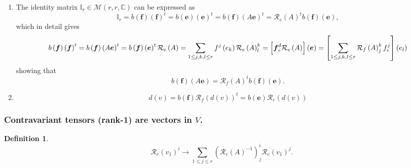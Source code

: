 \documentclass[aps,preprint]{revtex4}
\newtheorem{definition}[theorem]{Definition}
\begin{document}
\begin{enumerate}
\begin{enumerate}
\item The identity matrix $\mathbb{I}_{r}\in \mathcal{M}\left( r,r,\mathbb{C}%
\right) $ can be expressed as 
\begin{equation}
\mathbb{I}_{r}=b\left( \boldsymbol{f}\right) \left( \boldsymbol{f}\right)
^{t}=b\left( \boldsymbol{e}\right) \left( \boldsymbol{e}\right) ^{t}=b\left( 
\boldsymbol{f}\right) \left( A\boldsymbol{e}\right) ^{t}=\mathcal{R}%
_{e}\left( A\right) ^{t}b\left( \boldsymbol{f}\right) \left( \boldsymbol{e}%
\right) ,
\end{equation}%
which in detail gives%
\begin{equation}
b\left( \boldsymbol{f}\right) \left( \boldsymbol{f}\right) ^{t}=b\left( 
\boldsymbol{f}\right) \left( A\boldsymbol{e}\right) ^{t}=b\left( \boldsymbol{%
f}\right) \left( \boldsymbol{e}\right) ^{t}\mathcal{R}_{e}\left( A\right)
=\sum_{1\leq j,k,l\leq r}f^{j}\left( e_{k}\right) \mathcal{R}_{e}\left(
A\right) _{l}^{k}=\left[ \boldsymbol{f}_{e}^{d}\mathcal{R}_{e}\left(
A\right) \right] \left( \boldsymbol{e}\right) =\left[ \sum_{1\leq j,k,l\leq
r}\mathcal{R}_{f}\left( A\right) _{j}^{k}f_{e}^{j}\right] \left( e_{l}\right)
\end{equation}%
showing that%
\begin{equation}
b\left( \boldsymbol{f}\right) \left( A\boldsymbol{e}\right) =\mathcal{R}%
_{f}\left( A\right) ^{t}b\left( \boldsymbol{f}\right) \left( \boldsymbol{e}%
\right) .
\end{equation}

\item 
\begin{equation}
d\left( v\right) =b\left( \boldsymbol{f}\right) \mathcal{R}_{f}\left(
d\left( v\right) \right) ^{t}=b\left( \boldsymbol{e}\right) \mathcal{R}%
_{e}\left( d\left( v\right) \right)
\end{equation}
\end{enumerate}
\end{enumerate}

\subsubsection{\textbf{Contravariant tensors} (rank-1) are vectors in $V$. 
\label{ontravariant tensors (rank-1)}}

\begin{definition}
\begin{equation}
\mathcal{R}_{e}\left( v_{1}\right) ^{i}\rightarrow \sum_{1\leq j\leq r}(%
\mathcal{R}_{e}\left( A\right) ^{-1})_{j}^{i}\mathcal{R}_{e}\left(
v_{1}\right) ^{j}.
\end{equation}
\end{definition}
\end{document}

